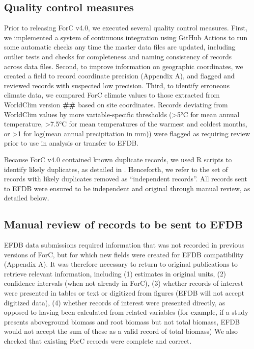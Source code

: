 \documentclass[, manuscript]{copernicus}
\begin{document}
\subsection{Quality control measures}

Prior to releasing ForC v4.0, we executed several quality control
measures. First, we implemented a system of continuous integration using
GitHub Actions \citep[\emph{sensu}][]{kim_implementing_2022} to run some
automatic checks any time the master data files are updated, including
outlier tests and checks for completeness and naming consistency of
records across data files. Second, to improve information on geographic
coordinates, we created a field to record coordinate precision (Appendix
A), and flagged and reviewed records with suspected low precision.
Third, to identify erroneous climate data, we compared ForC climate
values to those extracted from WorldClim version \textbf{\#\#}
\citep{climwin_ref} based on site coordinates. Records deviating from
WorldClim values by more variable-specific thresholds (\textgreater5°C
for mean annual temperature, \textgreater7.5°C for mean temperatures of
the warmest and coldest months, or \textgreater1 for log(mean annual
precipitation in mm)) were flagged as requiring review prior to use in
analysis or transfer to EFDB.

Because ForC v4.0 contained known duplicate records, we used R scripts
to identify likely duplicates, as detailed in
\citet{anderson-teixeira_carbon_2021}. Henceforth, we refer to the set
of records with likely duplicates removed as ``independent records''.
All records sent to EFDB were ensured to be independent and original
through manual review, as detailed below.

\subsection{Manual review of records to be sent to EFDB}

EFDB data submissions required information that was not recorded in
previous versions of ForC, but for which new fields were created for
EFDB compatibility (Appendix A). It was therefore necessary to return to
original publications to retrieve relevant information, including (1)
estimates in original units, (2) confidence intervals (when not already
in ForC), (3) whether records of interest were presented in tables or
text or digitized from figures (EFDB will not accept digitized data),
(4) whether records of interest were presented directly, as opposed to
having been calculated from related variables (for example, if a study
presents aboveground biomass and root biomass but not total biomass,
EFDB would not accept the sum of these as a valid record of total
biomass) We also checked that existing ForC records were complete and
correct.
\end{document}
